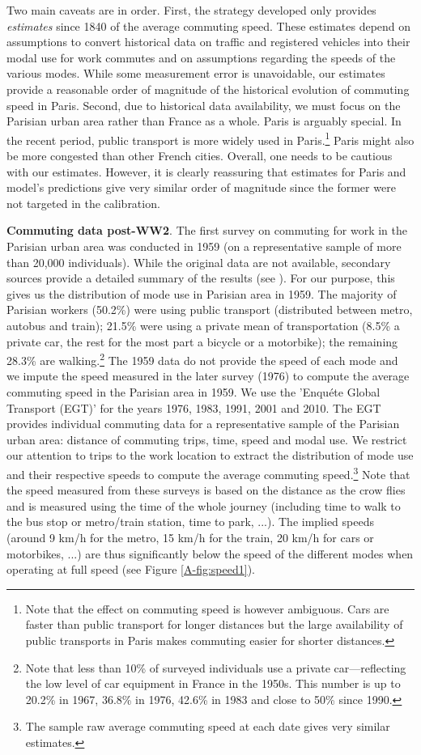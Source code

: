 \documentclass[11pt]{report}
\begin{document}
Two main caveats are in order. First, the strategy developed only provides \textit{estimates} since 1840 of the average commuting speed. These estimates depend on assumptions to convert historical data on traffic and registered vehicles into their modal use for work commutes and on assumptions regarding the speeds of the various modes. While some measurement error is unavoidable, our estimates provide a reasonable order of magnitude of the historical evolution of commuting speed in Paris. Second, due to historical data availability, we must focus on the Parisian urban area rather than France as a whole. Paris is arguably special. In the recent period, public transport is more widely used in Paris.\footnote{Note that the effect on commuting speed is however ambiguous. Cars are faster than public transport for longer distances but the large availability of public transports in Paris makes commuting easier for shorter distances.} Paris might also be more congested than other French cities. Overall, one needs to be cautious with our estimates. However, it is clearly reassuring that estimates for Paris and model's predictions give very similar order of magnitude since the former were not targeted in the calibration.

\noindent\textbf{Commuting data post-WW2}. The first survey on commuting for work in the Parisian urban area was conducted in 1959 (on a representative sample of more than 20,000 individuals). While the original data are not available, secondary sources provide a detailed summary of the results (see \cite{bertrand1962enquete}). For our purpose, this gives us the distribution of mode use in Parisian area in 1959. The majority of Parisian workers (50.2\%) were using public transport (distributed between metro, autobus and train); 21.5\%  were using a private mean of transportation (8.5\% a private car, the rest for the most part a bicycle or a motorbike); the remaining 28.3\% are walking.\footnote{Note that less than 10\% of surveyed individuals use a private car---reflecting the low level of car equipment in France in the 1950s. This number is up to 20.2\% in 1967, 36.8\% in 1976, 42.6\% in 1983 and close to 50\% since 1990.} The 1959 data do not provide the speed of each mode and we impute the speed measured in the later survey (1976) to compute the average commuting speed in the Parisian area in 1959. We use the 'Enqu\'ete Global Transport (EGT)' for the years 1976, 1983, 1991, 2001 and 2010. The EGT provides individual commuting data for a representative sample of the Parisian urban area: distance of commuting trips, time, speed and modal use. We restrict our attention to trips to the work location to extract the distribution of mode use and their respective speeds to compute the average commuting speed.\footnote{The sample raw average commuting speed at each date gives very similar estimates.} Note that the speed measured from these surveys is based on the distance as the crow flies and is measured using the time of the whole journey (including time to walk to the bus stop or metro/train station, time to park, ...). The implied speeds (around 9 km/h for the metro, 15 km/h for the train, 20 km/h for cars or motorbikes, ...) are thus significantly below the speed of the different modes when operating at full speed (see Figure \ref{A-fig:speed1}).
\end{document}
